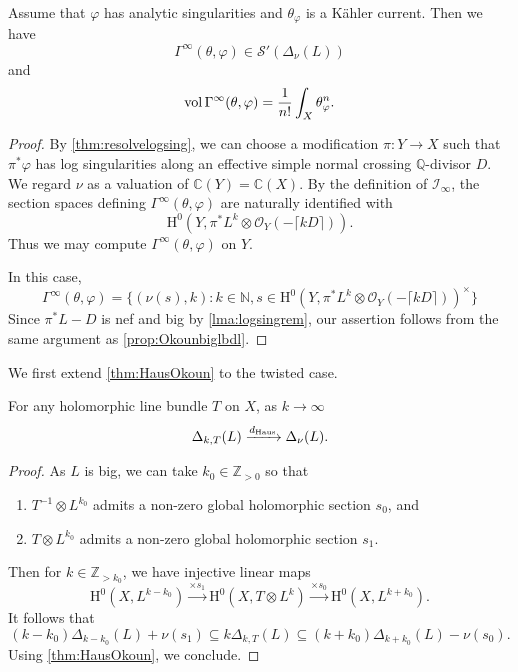 \begin{proposition}\label{prop:GammaepsSp}
Assume that $\varphi$ has analytic singularities and $\theta_{\varphi}$ is a Kähler current. Then we have
    \[
    \Gamma^{\infty}(\theta,\varphi)\in \mathcal{S}'(\Delta_\nu(L))
    \]
    and
    \[
    \operatorname{vol} \Gamma^{\infty}(\theta,\varphi)=\frac{1}{n!}\int_X \theta_{\varphi}^n.
    \]
\end{proposition}
\begin{proof}
    By \cref{thm:resolvelogsing}, we can choose a modification $\pi\colon Y\to X$ such that $\pi^*\varphi$ has log singularities along an effective simple normal crossing $\mathbb Q$-divisor $D$. We regard $\nu$ as a valuation of $\mathbb C(Y)=\mathbb C(X)$. By the definition of $\mathcal I_\infty$, the section spaces defining $\Gamma^\infty(\theta,\varphi)$ are naturally identified with
    \[
        \mathrm{H}^0\left(Y,\pi^*L^k\otimes\mathcal O_Y(-\lceil kD\rceil)\right).
    \]
    Thus we may compute $\Gamma^\infty(\theta,\varphi)$ on $Y$.


    In this case,
    \[
    \Gamma^{\infty}(\theta,\varphi)=
    \Biggl\{
    (\nu(s),k):k\in \mathbb{N},  s\in \mathrm{H}^0\left(Y,\pi^*L^k\otimes \mathcal{O}_Y(-\lceil k D \rceil)\right)^{\times}
    \Biggr\}
    \]
    Since $\pi^*L-D$ is nef and big by \cref{lma:logsingrem}, our assertion follows from the same argument as \cref{prop:Okounbiglbdl}.
\end{proof}

We first extend \cref{thm:HausOkoun} to the twisted case.
\begin{proposition}\label{prop:Deltaconvtwisted}
    For any holomorphic line bundle $T$ on $X$, as $k\to\infty$
    \[
        \Delta_{k,T}(L)\xrightarrow{d_{\mathrm{Haus}}} \Delta_{\nu}(L).
    \]
\end{proposition}

\begin{proof}
    As $L$ is big, we can take $k_0\in \mathbb{Z}_{>0}$ so that
    \begin{enumerate}
        \item\label{itm:chapter-Okounkov:L657:1} $T^{-1}\otimes L^{k_0}$ admits a non-zero global holomorphic section $s_0$, and
        \item\label{itm:chapter-Okounkov:L657:2} $T\otimes L^{k_0}$ admits a non-zero global holomorphic section $s_1$.
    \end{enumerate}
    Then for $k\in \mathbb{Z}_{>k_0}$, we have injective linear maps
    \[
        \mathrm{H}^0(X,L^{k-k_0})\xrightarrow{\times s_1}\mathrm{H}^0(X,T\otimes L^{k})\xrightarrow{\times s_0}\mathrm{H}^0(X, L^{k+k_0}).
    \]
    It follows that
    \[
        (k-k_0)\Delta_{k-k_0}(L)+\nu(s_1)\subseteq k\Delta_{k,T}(L)\subseteq (k+k_0)\Delta_{k+k_0}(L)-\nu(s_0).
    \]
    Using \cref{thm:HausOkoun}, we conclude.
\end{proof}

